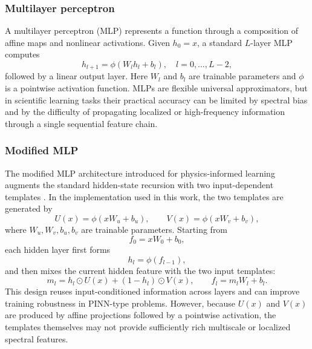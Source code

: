 \documentclass[preprint,12pt]{elsarticle}
\begin{document}
\subsubsection{Multilayer perceptron}

A multilayer perceptron (MLP) represents a function through a composition of affine maps and nonlinear activations. Given \(h_0=x\), a standard \(L\)-layer MLP computes
\begin{equation}
  h_{l+1}
  =
  \phi(W_l h_l+b_l),
  \quad l=0,\ldots,L-2,
\end{equation}
followed by a linear output layer. Here \(W_l\) and \(b_l\) are trainable parameters and \(\phi\) is a pointwise activation function. MLPs are flexible universal approximators, but in scientific learning tasks their practical accuracy can be limited by spectral bias and by the difficulty of propagating localized or high-frequency information through a single sequential feature chain.

\subsubsection{Modified MLP}

The modified MLP architecture introduced for physics-informed learning augments the standard hidden-state recursion with two input-dependent templates \cite{wang2021gradientpathologies}. In the implementation used in this work, the two templates are generated by
\begin{equation}
  U(x)=\phi(xW_u+b_u),
  \qquad
  V(x)=\phi(xW_v+b_v),
\end{equation}
where \(W_u,W_v,b_u,b_v\) are trainable parameters. Starting from
\begin{equation}
  f_0=xW_0+b_0,
\end{equation}
each hidden layer first forms
\begin{equation}
  h_l=\phi(f_{l-1}),
\end{equation}
and then mixes the current hidden feature with the two input templates:
\begin{equation}
  m_l=h_l\odot U(x)+\left(1-h_l\right)\odot V(x),
  \qquad
  f_l=m_lW_l+b_l.
\end{equation}
This design reuses input-conditioned information across layers and can improve training robustness in PINN-type problems. However, because \(U(x)\) and \(V(x)\) are produced by affine projections followed by a pointwise activation, the templates themselves may not provide sufficiently rich multiscale or localized spectral features.
\end{document}

